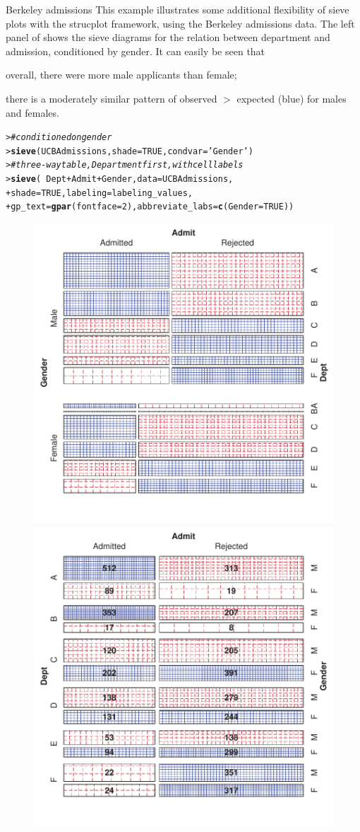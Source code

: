 \documentclass[10pt,krantz2]{krantz}\usepackage[]{graphicx}\usepackage[]{color}
\makeatletter
\newcommand{\hlnum}[1]{\textcolor[rgb]{0.686,0.059,0.569}{#1}}%
\newcommand{\hlstr}[1]{\textcolor[rgb]{0.192,0.494,0.8}{#1}}%
\newcommand{\hlcom}[1]{\textcolor[rgb]{0.678,0.584,0.686}{\textit{#1}}}%
\newcommand{\hlopt}[1]{\textcolor[rgb]{0,0,0}{#1}}%
\newcommand{\hlstd}[1]{\textcolor[rgb]{0.345,0.345,0.345}{#1}}%
\newcommand{\hlkwc}[1]{\textcolor[rgb]{0.333,0.667,0.333}{#1}}%
\newcommand{\hlkwd}[1]{\textcolor[rgb]{0.737,0.353,0.396}{\textbf{#1}}}%
\newenvironment{kframe}{%
 \def\at@end@of@kframe{}%
 \ifinner\ifhmode%
  \def\at@end@of@kframe{\end{minipage}}%
  \begin{minipage}{\columnwidth}%
 \fi\fi%
 \def\FrameCommand##1{\hskip\@totalleftmargin \hskip-\fboxsep
 \colorbox{shadecolor}{##1}\hskip-\fboxsep
     \hskip-\linewidth \hskip-\@totalleftmargin \hskip\columnwidth}%
 \MakeFramed {\advance\hsize-\width
   \@totalleftmargin\z@ \linewidth\hsize
   \@setminipage}}%
 {\par\unskip\endMakeFramed%
 \at@end@of@kframe}
\newenvironment{knitrout}{}{} %
\renewenvironment{knitrout}{\small\renewcommand{\baselinestretch}{.85}}{} %
\makeatother
\begin{document}
\begin{Example}[berkeley3]{Berkeley admissions}
This example illustrates some additional flexibility of sieve plots
with the strucplot framework, using the Berkeley admissions data.
The left panel of  shows the sieve diagrams for
the relation between department and admission, conditioned by gender.
It can easily be seen that
\begin{seriate}
  \item overall, there were more male applicants than female;
  \item there is a moderately similar pattern of observed $>$ expected (blue)
  for males and females.
\end{seriate}
\begin{knitrout}
\color{fgcolor}\begin{kframe}
\begin{alltt}
\hlstd{> }\hlcom{# conditioned on gender}
\hlstd{> }\hlkwd{sieve}\hlstd{(UCBAdmissions,} \hlkwc{shade} \hlstd{=} \hlnum{TRUE}\hlstd{,} \hlkwc{condvar} \hlstd{=} \hlstr{'Gender'}\hlstd{)}
\hlstd{> }\hlcom{# three-way table, Department first, with cell labels}
\hlstd{> }\hlkwd{sieve}\hlstd{(}\hlopt{~} \hlstd{Dept} \hlopt{+} \hlstd{Admit} \hlopt{+} \hlstd{Gender,} \hlkwc{data} \hlstd{= UCBAdmissions,}
\hlstd{+ }      \hlkwc{shade} \hlstd{=} \hlnum{TRUE}\hlstd{,} \hlkwc{labeling} \hlstd{= labeling_values,}
\hlstd{+ }      \hlkwc{gp_text} \hlstd{=} \hlkwd{gpar}\hlstd{(}\hlkwc{fontface} \hlstd{=} \hlnum{2}\hlstd{),} \hlkwc{abbreviate_labs} \hlstd{=} \hlkwd{c}\hlstd{(}\hlkwc{Gender} \hlstd{=} \hlnum{TRUE}\hlstd{))}
\end{alltt}
\end{kframe}\begin{figure}[!htbp]

\centerline{\includegraphics[width=.49\textwidth]{ch04/fig/berkeley-sieve-1} 
\includegraphics[width=.49\textwidth]{ch04/fig/berkeley-sieve-2} }


\end{figure}
\end{knitrout}
\end{Example}
\end{document}
